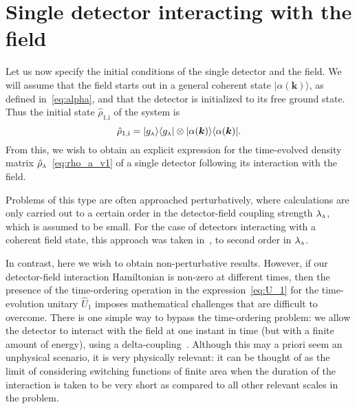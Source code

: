 \documentclass[pra,nofootinbib,floats,aps,twocolumn,tightenlines,superscriptaddress]{revtex4-1}
\newcommand{\ket}[1]{| {#1} \rangle}
\newcommand{\bra}[1]{\langle {#1} |}
\newcommand{\rhoa}{\hat{\rho}_\textsc{a}}
\begin{document}
\section{Single detector interacting with the field}
\label{sec:one_detector}

Let us now specify the initial conditions of the single detector and the field. We will assume that the field starts out in a general coherent state $\ket{\alpha(\bm k)}$, as defined in~\eqref{eq:alpha}, and that the detector is initialized to its free ground state. Thus the initial state $\hat{\rho}_\text{1,i}$ of the system is
\begin{equation}
\label{eq:rho_1i}
    \hat{\rho}_\text{1,i}
    =
    \ket{g_\textsc{a}}\bra{g_\textsc{a}}
    \otimes
    \ket{\alpha(\bm k)}\bra{\alpha(\bm k)}.
\end{equation}
From this, we wish to obtain an explicit expression for the time-evolved density matrix $\rhoa$~\eqref{eq:rho_a_v1} of a single detector following its interaction with the field. 

Problems of this type are often approached perturbatively, where calculations are only carried out to a certain order in the detector-field coupling strength $\lambda_\textsc{a}$, which is assumed to be small. For the case of detectors interacting with a coherent field state, this approach was taken in~\cite{Simidzija2017b}, to second order in $\lambda_\textsc{a}$.

In contrast, here we wish to obtain non-perturbative results. However, if our detector-field interaction Hamiltonian is non-zero at different times, then the presence of the time-ordering operation in the expression~\eqref{eq:U_1} for the time-evolution unitary $\hat{U}_1$ imposes mathematical challenges that are difficult to overcome. There is one simple way to bypass the time-ordering problem: we allow the detector to interact with the field at one instant in time (but with a finite amount of energy), using a delta-coupling~\cite{Hotta2008}. Although this may a priori seem an unphysical scenario, it is very physically relevant: it can be thought of as the limit of considering switching functions of finite area when the duration of the interaction is taken to be very short as compared to all other relevant scales in the problem.
\end{document}
